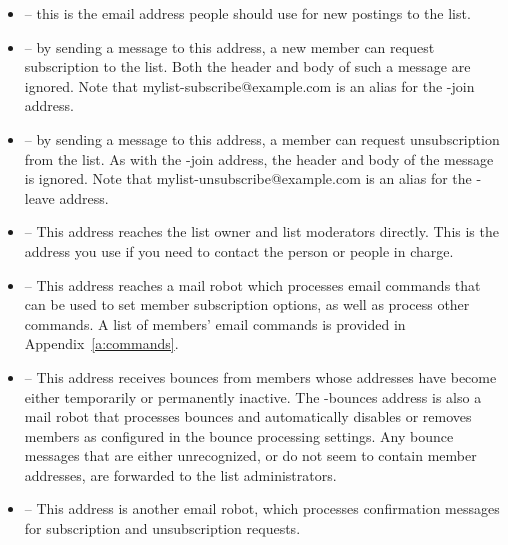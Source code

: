 \documentclass{howto}
\begin{document}
\begin{itemize}
\item {} -- this is the email address people should
      use for new postings to the list.

\item {} -- by sending a message to this address,
      a new member can request subscription to the list.  Both the
       header and body of such a message are
      ignored.  Note that mylist-subscribe@example.com is an alias for
      the -join address.

\item {} -- by sending a message to this address,
      a member can request unsubscription from the list.  As with the
      -join address, the  header and body of the
      message is ignored.  Note that mylist-unsubscribe@example.com is
      an alias for the -leave address.

\item {} -- This address reaches the list owner
      and list moderators directly.  This is the address you use if 
		you need to contact the person or people in charge.

\item {} -- This address reaches a mail robot
      which processes email commands that can be used to set member
      subscription options, as well as process other commands.
      A list of members' email commands is provided in 
		Appendix~\ref{a:commands}.

\item {} -- This address receives bounces from
      members whose addresses have become either temporarily or
      permanently inactive.  The -bounces address is also a mail robot
      that processes bounces and automatically disables or removes
      members as configured in the bounce processing settings.  Any
      bounce messages that are either unrecognized, or do not seem to
      contain member addresses, are forwarded to the list
      administrators.

\item {} -- This address is another email
      robot, which processes confirmation messages for subscription
      and unsubscription requests.
\end{itemize}
\end{document}
